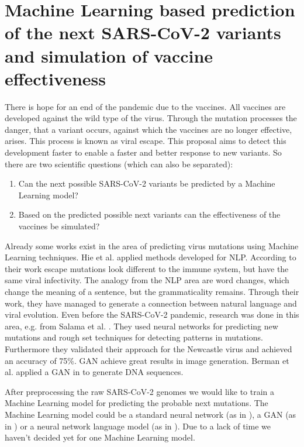 \section{Machine Learning based prediction of the next SARS-CoV-2 variants and simulation of vaccine effectiveness} \label{proposal1}

There is hope for an end of the pandemic due to the vaccines. All vaccines are developed against the wild type of the virus. Through the mutation processes the danger, that a variant occurs, against which the vaccines  are no longer effective, arises. This process is known as viral escape. This proposal aims to detect this development faster to enable a faster and better response to new variants. So there are two scientific questions (which can also be separated):

\begin{enumerate}
	\item Can the next possible SARS-CoV-2 variants be predicted by a Machine Learning model?
	\item Based on the  predicted possible next variants can the effectiveness of the vaccines be simulated?
\end{enumerate}

Already some works exist in the area of predicting virus mutations using Machine Learning techniques. Hie et al. \cite{Hie2021} applied methods developed for \ac{NLP}.  According to their work escape mutations look different to the immune system, but have the same viral infectivity. The analogy from the \ac{NLP} area are word changes, which change the meaning of a sentence, but the grammaticality remains. Through their work, they have managed to generate a connection between natural language and viral evolution. Even before the SARS-CoV-2 pandemic, research was done in this area, e.g. from Salama et al. \cite{Salama2016}. They used neural networks for predicting new mutations and rough set techniques for detecting patterns in mutations. Furthermore they validated their approach for the Newcastle virus and achieved an accuracy of 75\%. \ac{GAN} achieve great results in image generation. Berman et al. applied a \ac{GAN} in \cite{Berman2020} to generate \ac{DNA} sequences.

After preprocessing the raw SARS-CoV-2 genomes we would like to train a Machine Learning model for predicting the probable next mutations. The Machine Learning model could be a standard neural network (as in  \cite{Salama2016}), a GAN (as in \cite{Berman2020}) or a neural network language model (as in \cite{Hie2021}). Due to a lack of time we haven't decided yet for one Machine Learning model.

